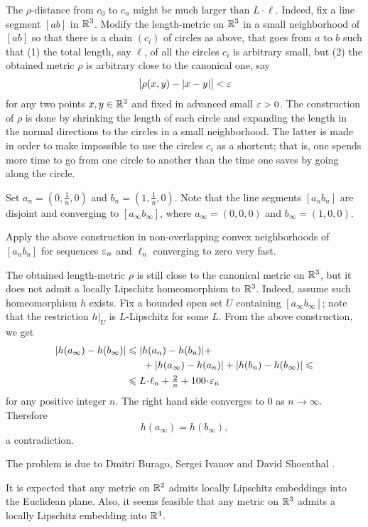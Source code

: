 The $\rho$-distance from $c_0$ to $c_n$ might be much larger than $L\cdot\ell$.
Indeed, fix a line segment $[ab]$ in $\mathbb{R}^3$.
Modify 
the length-metric on $\mathbb{R}^3$ in a small neighborhood of $[ab]$
so that there is a chain $(c_i)$ of circles as above,
that goes from $a$ to $b$ 
such that
(1) the total length, say $\ell$, 
of all the circles $c_i$ is arbitrary small,
but 
(2) the obtained metric $\rho$ 
is arbitrary close to the canonical one, say
\[\bigl|\rho(x,y)-|x-y|\bigr|<\varepsilon\]
for any two points $x,y\in\mathbb{R}^3$
and fixed in advanced small $\varepsilon>0$.
The construction of $\rho$ 
is done by shrinking the length of each circle
and expanding the length in the normal directions  
to the circles in a small neighborhood.
The latter is made in order to make impossible to use the circles $c_i$ as a shortcut;
that is, one spends more time to go from one circle to another 
than the time one saves by going along the circle.

Set $a_n=(0,\tfrac1n,0)$ and $b_n=(1,\tfrac1n,0)$.
Note that the line segments $[a_nb_n]$ are disjoint and converging
to $[a_\infty b_\infty]$,
where $a_\infty=(0,0,0)$ and $b_\infty=(1,0,0)$.

Apply the above construction in non-overlapping convex neighborhoods of $[a_nb_n]$ 
for sequences 
$\varepsilon_n$ and $\ell_n$ 
converging to zero very fast.

The obtained length-metric $\rho$ is still close to the canonical metric on $\mathbb{R}^3$,
but it does not admit 
a locally Lipschitz homeomorphism to $\mathbb{R}^3$.
Indeed, 
assume such homeomorphism $h$ exists.
Fix a bounded open set $U$ containing $[a_\infty b_\infty]$;
note that the restriction $h|_U$ is $L$-Lipschitz for some $L$.
From the above construction,
we get 
\begin{align*}
|h(a_\infty)-h(b_\infty)|
&\le 
|h(a_n)-h(b_n)|
+
\\
&\ \ \ \ \ +
|h(a_\infty)-h(a_n)|
+
|h(b_n)-h(b_\infty)|
\le
\\
&\le
L\cdot\ell_n+\tfrac2n+100\cdot\eps_n
\end{align*}
for any positive integer $n$.
The right hand side converges to $0$ as $n\to\infty$.
Therefore 
\[h(a_\infty)=h(b_\infty),\] 
a contradiction.\qeds



The problem is due to
Dmitri Burago, 
Sergei Ivanov 
and David Shoenthal \cite[see][]{BIS}.

It is expected that any metric on $\mathbb{R}^2$ admits locally Lipschitz embeddings into the Euclidean plane.
Also, it seems feasible that any metric on $\mathbb{R}^3$ admits a locally Lipschitz embedding into $\mathbb{R}^4$.

